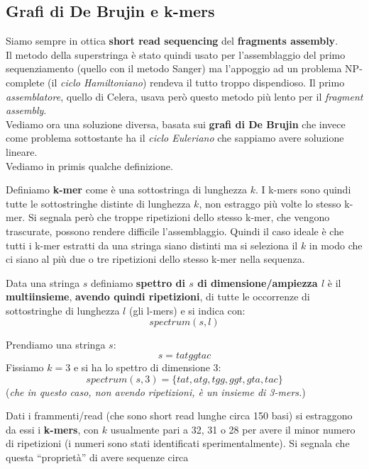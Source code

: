 \documentclass[a4paper,12pt, oneside]{book}
\begin{document}
\subsection{Grafi di De Brujin e k-mers}
Siamo sempre in ottica \textbf{short read sequencing} del \textbf{fragments
  assembly}.\\ 
Il metodo della superstringa è stato quindi usato per l'assemblaggio del primo
sequenziamento (quello con il metodo Sanger) ma l'appoggio ad un problema
NP-complete (il \textit{ciclo Hamiltoniano}) rendeva il tutto troppo
dispendioso. Il primo \textit{assemblatore}, quello di Celera, usava però questo
metodo più lento per il \textit{fragment assembly}.\\
Vediamo ora una soluzione diversa, basata sui \textbf{grafi di De Brujin} che
invece come problema sottostante ha il \textit{ciclo Euleriano} che sappiamo
avere soluzione lineare. \\
Vediamo in primis qualche definizione.
\begin{definizione}
  Definiamo \textbf{k-mer} come è una sottostringa di lunghezza
  $k$. I k-mers sono quindi tutte le sottostringhe distinte di lunghezza $k$,
  non estraggo più volte lo stesso k-mer. Si segnala però che troppe
  ripetizioni dello stesso k-mer, che vengono trascurate, possono rendere
  difficile l'assemblaggio. Quindi il caso ideale è che tutti i k-mer estratti
  da una stringa siano distinti ma si seleziona il $k$ in modo che ci siano al
  più due o tre ripetizioni dello stesso k-mer nella sequenza.
\end{definizione}
\begin{definizione}
  Data una stringa $s$ definiamo \textbf{spettro di $s$ di dimensione/ampiezza
    $l$} è il 
  \textbf{multiinsieme}, \textbf{avendo quindi ripetizioni}, di tutte le
  occorrenze di sottostringhe di lunghezza $l$ (gli l-mers) e si indica con:
  \[spectrum(s,l)\]
\end{definizione}
\begin{esempio}
  Prendiamo una stringa $s$:
  \[s=tatggtac\]
  Fissiamo $k=3$ e si ha lo spettro di dimensione $3$:
  \[spectrum(s,3)=\{tat, atg, tgg, ggt, gta, tac\}\]
  (\textit{che in questo caso, non avendo ripetizioni, è un insieme di 3-mers.})
\end{esempio}
Dati i frammenti/read (che sono short read lunghe circa 150 basi) si estraggono
da essi i \textbf{k-mers}, con $k$ usualmente pari a 32, 31 o 28 per avere il
minor numero di ripetizioni (i numeri sono stati identificati
sperimentalmente). Si segnala che questa ``proprietà'' di avere sequenze circa
\end{document}
